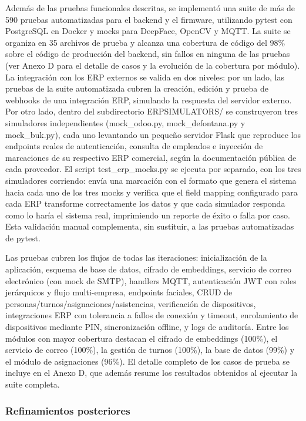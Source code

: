 Además de las pruebas funcionales descritas, se implementó una suite de más de 590 pruebas automatizadas para el backend y el firmware, utilizando pytest con PostgreSQL en Docker y mocks para DeepFace, OpenCV y MQTT. La suite se organiza en 35 archivos de prueba y alcanza una cobertura de código del 98\% sobre el código de producción del backend, sin fallos en ninguna de las pruebas (ver Anexo D para el detalle de casos y la evolución de la cobertura por módulo). La integración con los ERP externos se valida en dos niveles: por un lado, las pruebas de la suite automatizada cubren la creación, edición y prueba de webhooks de una integración ERP, simulando la respuesta del servidor externo. Por otro lado, dentro del subdirectorio ERPSIMULATORS/ se construyeron tres simuladores independientes (mock\_odoo.py, mock\_defontana.py y mock\_buk.py), cada uno levantando un pequeño servidor Flask que reproduce los endpoints reales de autenticación, consulta de empleados e inyección de marcaciones de su respectivo ERP comercial, según la documentación pública de cada proveedor. El script test\_erp\_mocks.py se ejecuta por separado, con los tres simuladores corriendo: envía una marcación con el formato que genera el sistema hacia cada uno de los tres mocks y verifica que el field mapping configurado para cada ERP transforme correctamente los datos y que cada simulador responda como lo haría el sistema real, imprimiendo un reporte de éxito o falla por caso. Esta validación manual complementa, sin sustituir, a las pruebas automatizadas de pytest.

Las pruebas cubren los flujos de todas las iteraciones: inicialización de la aplicación, esquema de base de datos, cifrado de embeddings, servicio de correo electrónico (con mock de SMTP), handlers MQTT, autenticación JWT con roles jerárquicos y flujo multi-empresa, endpoints faciales, CRUD de personas/turnos/asignaciones/asistencias, verificación de dispositivos, integraciones ERP con tolerancia a fallos de conexión y timeout, enrolamiento de dispositivos mediante PIN, sincronización offline, y logs de auditoría. Entre los módulos con mayor cobertura destacan el cifrado de embeddings (100\%), el servicio de correo (100\%), la gestión de turnos (100\%), la base de datos (99\%) y el módulo de asignaciones (96\%). El detalle completo de los casos de prueba se incluye en el Anexo D, que además resume los resultados obtenidos al ejecutar la suite completa.

\subsubsection{Refinamientos posteriores}

